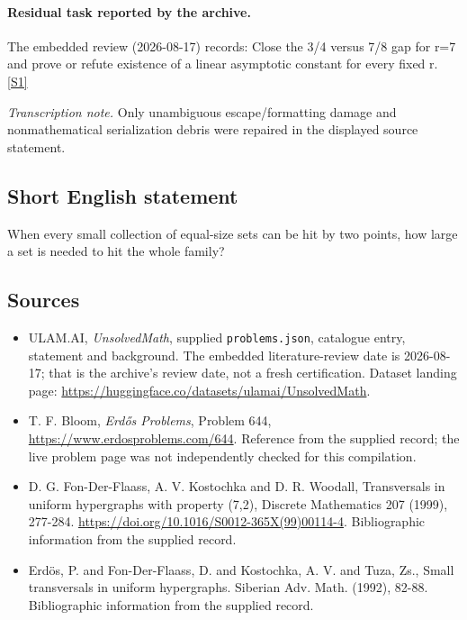 \documentclass[11pt,a4paper]{article}
\newcommand{\sref}[2]{\hyperlink{source:#1:#2}{[S#2]}}
\begin{document}
\paragraph{Residual task reported by the archive.}

The embedded review (2026-08-17) records: Close the 3/4 versus 7/8 gap for r=7 and prove or refute existence of a linear asymptotic constant for every fixed r. \sref{statement}{1}

{\small\emph{Transcription note.} Only unambiguous escape/formatting damage and nonmathematical serialization debris were repaired in the displayed source statement.}

\subsection{Short English statement}

When every small collection of equal-size sets can be hit by two points, how large a set is needed to hit the whole family?

\subsection{Sources}

{\small

\begin{itemize}

\item[\hypertarget{source:statement:1}{S1}] ULAM.AI, \emph{UnsolvedMath}, supplied \texttt{problems.json}, catalogue entry, statement and background. The embedded literature-review date is 2026-08-17; that is the archive’s review date, not a fresh certification. Dataset landing page: \url{https://huggingface.co/datasets/ulamai/UnsolvedMath}.

\item[\hypertarget{source:statement:2}{S2}] T. F. Bloom, \emph{Erdős Problems}, Problem 644, \url{https://www.erdosproblems.com/644}. Reference from the supplied record; the live problem page was not independently checked for this compilation.

\item[\hypertarget{source:statement:3}{S3}] D. G. Fon-Der-Flaass, A. V. Kostochka and D. R. Woodall, Transversals in uniform hypergraphs with property (7,2), Discrete Mathematics 207 (1999), 277-284. \url{https://doi.org/10.1016/S0012-365X(99)00114-4}. Bibliographic information from the supplied record.

\item[\hypertarget{source:statement:4}{S4}] Erd\"{o}s, P. and Fon-Der-Flaass, D. and Kostochka, A. V. and Tuza, Zs., Small transversals in uniform hypergraphs. Siberian Adv. Math. (1992), 82-88. Bibliographic information from the supplied record.

\end{itemize}

}

\label{end:statement}
\end{document}
